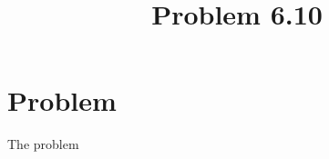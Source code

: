 \documentclass{article}
\title{Problem 6.10}
\begin{document}
\maketitle

\section{Problem}

The problem
\end{document}
